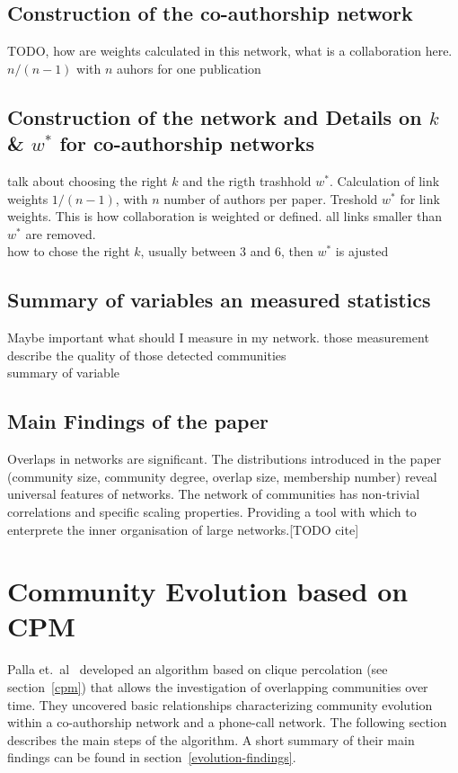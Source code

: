\documentclass[runningheads,a4paper]{llncs}
\begin{document}
\subsection{Construction of the co-authorship network}
TODO, how are weights calculated in this network, what is a collaboration here. $n/(n-1)$ with $n$ auhors for one publication

\subsection{Construction of the network and Details on $k$ \& $w^*$ for co-authorship networks}
\label{cpm-construction}
talk about choosing the right $k$ and the rigth trashhold $w^*$. Calculation of link weights $1/(n-1)$, with $n$ number of authors per paper. Treshold $w^*$ for link weights. This is how collaboration is weighted or defined. all links smaller than $w^*$ are removed.\\
how to chose the right $k$, usually between $3$ and $6$, then $w^*$ is ajusted\\

\subsection{Summary of variables an measured statistics}
Maybe important what should I measure in my network.
those measurement describe the quality of those detected communities\\
summary of variable\\


\subsection{Main Findings of the paper}
Overlaps in networks are significant. The distributions introduced in the paper (community size, community degree, overlap size, membership number) reveal universal features of networks. The network of communities has non-trivial correlations and specific scaling properties. Providing a tool with which to enterprete the inner organisation of large networks.[TODO cite]

\section{Community Evolution based on CPM}
\label{evolution}
Palla et.~al~\cite{palla2007quantifying} developed an algorithm based on clique percolation (see section~\ref{cpm}) that allows the investigation of overlapping communities over time. They uncovered basic relationships characterizing community evolution within a co-authorship network and a phone-call network. The following section describes the main steps of the algorithm. A short summary of their main findings can be found in section~\ref{evolution-findings}.
\end{document}
